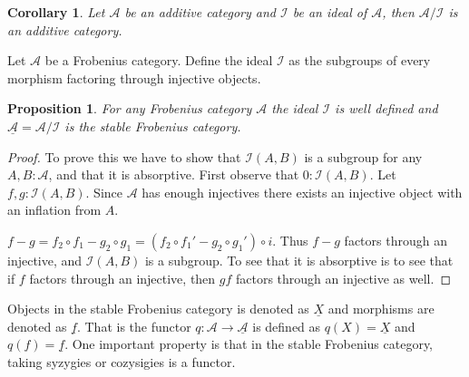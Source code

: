 \documentclass[11pt]{article}
\newtheorem{corollary}{Corollary}[theorem]
\newtheorem{prop}[theorem]{Proposition}
\theoremstyle{definition}
\theoremstyle{remark}
\begin{document}
            \begin{corollary}
                Let $\mathcal{A}$ be an additive category and $\mathcal{I}$ be an ideal of $\mathcal{A}$, then $\mathcal{A}/\mathcal{I}$ is an additive category.
            \end{corollary}

            Let $\mathcal{A}$ be a Frobenius category. Define the ideal $\mathcal{I}$ as the subgroups of every morphism factoring through injective objects.

            \begin{prop}
                For any Frobenius category $\mathcal{A}$ the ideal $\mathcal{I}$ is well defined and $\underline{\mathcal{A}}=\mathcal{A}/\mathcal{I}$ is the stable Frobenius category.
            \end{prop}

            \begin{proof}
                To prove this we have to show that $\mathcal{I}(A,B)$ is a subgroup for any $A,B:\mathcal{A}$, and that it is absorptive.
                First observe that $0:\mathcal{I}(A,B)$. Let $f,g:\mathcal{I}(A,B)$. Since $\mathcal{A}$ has enough injectives there exists an injective object with an inflation from $A$.
                \begin{center}
                \end{center}
                $f-g = f_2 \circ f_1 - g_2 \circ g_1 = (f_2 \circ f_1' - g_2 \circ g_1') \circ i$. Thus $f-g$ factors through an injective, and $\mathcal{I}(A,B)$ is a subgroup.
                To see that it is absorptive is to see that if $f$ factors through an injective, then $gf$ factors through an injective as well.
            \end{proof}

            Objects in the stable Frobenius category is denoted as $\underline{X}$ and morphisms are denoted as $\underline{f}$. That is the functor $q:\mathcal{A}\rightarrow\underline{\mathcal{A}}$ is defined as $q(X)=\underline{X}$ and $q(f)=\underline{f}$. One important property is that in the stable Frobenius category, taking syzygies or cozysigies is a functor.
\end{document}
